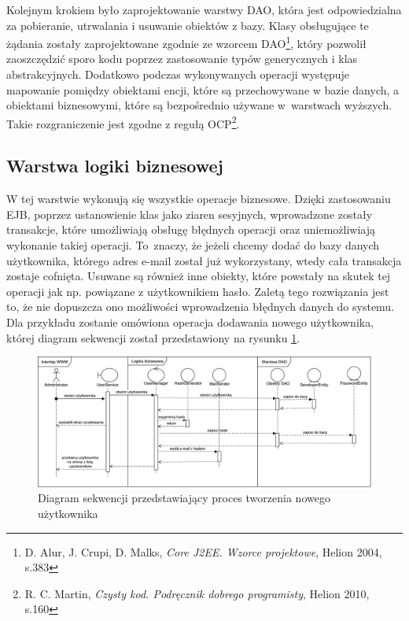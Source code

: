 Kolejnym krokiem było zaprojektowanie warstwy DAO, która jest odpowiedzialna za pobieranie, utrwalania i usuwanie obiektów z bazy. Klasy obsługujące te żądania zostały zaprojektowane zgodnie ze wzorcem DAO\footnote{D. Alur, J. Crupi, D. Malks, \textit{Core J2EE. Wzorce projektowe}, Helion 2004, s.383}, który pozwolił zaoszczędzić sporo kodu poprzez zastosowanie typów generycznych i klas abstrakcyjnych. Dodatkowo podczas wykonywanych operacji występuje mapowanie pomiędzy obiektami encji, które są przechowywane w bazie danych, a obiektami biznesowymi, które są bezpośrednio używane w~warstwach wyższych. Takie rozgraniczenie jest zgodne z regułą OCP\footnote{R. C. Martin, \textit{Czysty kod. Podręcznik dobrego programisty}, Helion 2010, s.160}.


\subsection{Warstwa logiki biznesowej}
W tej warstwie wykonują się wszystkie operacje biznesowe. Dzięki zastosowaniu EJB, poprzez ustanowienie klas jako ziaren sesyjnych, wprowadzone zostały transakcje, które umożliwiają obsługę błędnych operacji oraz uniemożliwiają wykonanie takiej operacji. To~znaczy, że jeżeli chcemy dodać do bazy danych użytkownika, którego adres e-mail został już wykorzystany, wtedy cała transakcja zostaje cofnięta. Usuwane są również inne obiekty, które powstały na skutek tej operacji jak np. powiązane z użytkownikiem hasło. Zaletą tego rozwiązania jest to, że nie dopuszcza ono możliwości wprowadzenia błędnych danych do systemu. Dla przykładu zostanie omówiona operacja dodawania nowego użytkownika, której diagram sekwencji został przedstawiony na rysunku \ref{fig:diagsekw}. 

\begin{figure}
	\centering
	\includegraphics[width=25cm]{rysunki/diagsekw.pdf}	
	\caption{Diagram sekwencji przedstawiający proces tworzenia nowego użytkownika}
	\label{fig:diagsekw}
\end{figure}

